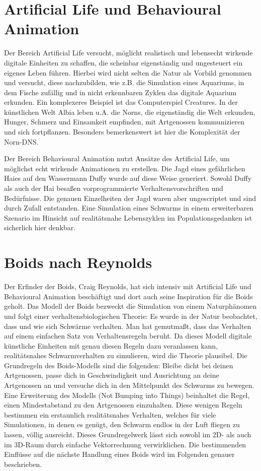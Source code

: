 \documentclass[draft=false
              ,paper=a4
              ,twoside=false
              ,fontsize=11pt
              ,headsepline
              ,BCOR10mm
              ,DIV11
              ,bibtotoc
              ,liststotoc
              ]{scrbook}
\begin{document}
\section{Artificial Life und Behavioural Animation}
Der Bereich Artificial Life versucht, möglicht realistisch und lebensecht wirkende digitale Einheiten zu schaffen, die scheinbar eigenständig und ungesteuert ein eigenes Leben führen. Hierbei wird nicht selten die Natur als Vorbild genommen und versucht, diese nachzubilden, wie z.B. die Simulation eines Aquariums, in dem Fische zufällig und in nicht erkennbaren Zyklen das digitale Aquarium erkunden. Ein komplexeres Beispiel ist das Computerspiel Creatures. In der künstlichen Welt Albia leben u.A. die Norns, die eigenständig die Welt erkunden, Hunger, Schmerz und Einsamkeit empfinden, mit Artgenossen kommunizieren und sich fortpflanzen. Besonders bemerkenswert ist hier die Komplexität der Norn-DNS.

Der Bereich Behavioural Animation nutzt Ansätze des Artificial Life, um möglichst echt wirkende Animationen zu erstellen. Die Jagd eines gefährlichen Haies auf den Wassermann Duffy wurde auf diese Weise generiert. Sowohl Duffy als auch der Hai besaßen vorprogrammierte Verhaltensvorschriften und Bedürfnisse. Die genauen Einzelheiten der Jagd waren aber ungescriptet und sind durch Zufall entstanden.
Eine Simulation eines Schwarms in einem erweiterbaren Szenario im Hinsicht auf realitätsnahe Lebenszyklen im Populationsgedanken ist sicherlich hier denkbar.
\section{Boids nach Reynolds}
Der Erfinder der Boids, Craig Reynolds, hat sich intensiv mit Artificial Life und Behavioural Animation beschäftigt und dort auch seine Inspiration für die Boids geholt.
Das Modell der Boids bezweckt die Simulation von einem Naturphänomen und folgt einer verhaltensbiologischen Theorie: Es wurde in der Natur beobachtet, dass und wie sich Schwärme verhalten. Man hat gemutmaßt, dass das Verhalten auf einem einfachen Satz von Verhaltensregeln beruht. Da dieses Modell digitale künstliche Einheiten mit genau diesen Regeln dazu veranlassen kann, realitätsnahes Schwarmverhalten zu simulieren, wird die Theorie plausibel.
Die Grundregeln des Boids-Modells sind die folgenden: Bleibe dicht bei deinen Artgenossen, passe dich in Geschwindigkeit und Ausrichtung an deine Artgenossen an und versuche dich in den Mittelpunkt des Schwarms zu bewegen.
Eine Erweiterung des Modells (Not Bumping into Things) beinhaltet die Regel, einen Mindestabstand zu den Artgenossen einzuhalten.
Diese wenigen Regeln bestimmen ein erstaunlich realitätsnahes Verhalten, welches für viele Simulationen, in denen es genügt, den Schwarm endlos in der Luft fliegen zu lassen, völlig ausreicht. Dieses Grundregelwerk lässt sich sowohl im 2D- als auch im 3D-Raum durch einfache Vektorrechnung verwirklichen. Die bestimmenden Einflüsse auf die nächste Handlung eines Boids wird im Folgenden genauer beschrieben.
\end{document}
